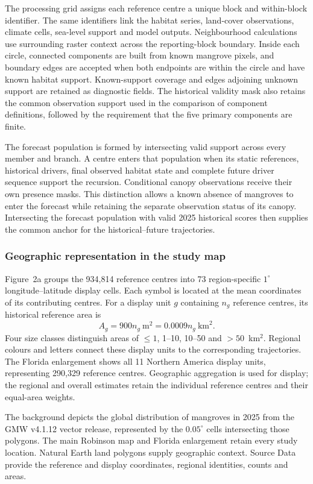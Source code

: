 The processing grid assigns each reference centre a unique block and within-block identifier. The same identifiers link the habitat series, land-cover observations, climate cells, sea-level support and model outputs. Neighbourhood calculations use surrounding raster context across the reporting-block boundary. Inside each circle, connected components are built from known mangrove pixels, and boundary edges are accepted when both endpoints are within the circle and have known habitat support. Known-support coverage and edges adjoining unknown support are retained as diagnostic fields. The historical validity mask also retains the common observation support used in the comparison of component definitions, followed by the requirement that the five primary components are finite.

The forecast population is formed by intersecting valid support across every member and branch. A centre enters that population when its static references, historical drivers, final observed habitat state and complete future driver sequence support the recursion. Conditional canopy observations receive their own presence masks. This distinction allows a known absence of mangroves to enter the forecast while retaining the separate observation status of its canopy. Intersecting the forecast population with valid 2025 historical scores then supplies the common anchor for the historical--future trajectories.

\subsubsection{Geographic representation in the study map}
Figure~2a groups the 934,814 reference centres into 73 region-specific $1^\circ$ longitude--latitude display cells. Each symbol is located at the mean coordinates of its contributing centres. For a display unit $g$ containing $n_g$ reference centres, its historical reference area is
\[
A_g=900n_g\ \mathrm{m}^{2}=0.0009n_g\ \mathrm{km}^{2}.
\] Four size classes distinguish areas of $\leq1$, 1--10, 10--50 and $>50$~km$^2$. Regional colours and letters connect these display units to the corresponding trajectories. The Florida enlargement shows all 11 Northern America display units, representing 290,329 reference centres. Geographic aggregation is used for display; the regional and overall estimates retain the individual reference centres and their equal-area weights.

The background depicts the global distribution of mangroves in 2025 from the GMW v4.1.12 vector release\cite{GMW2026}, represented by the $0.05^\circ$ cells intersecting those polygons. The main Robinson map and Florida enlargement retain every study location. Natural Earth land polygons supply geographic context. Source Data provide the reference and display coordinates, regional identities, counts and areas.

